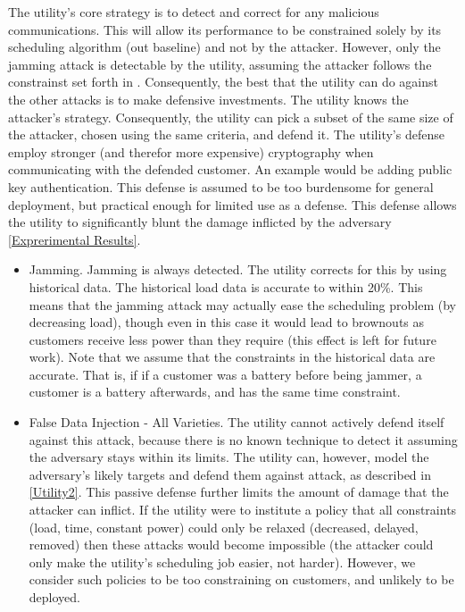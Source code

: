 \documentclass[conference]{IEEEtran}
\begin{document}
The utility's core strategy is to detect and correct for any malicious communications. This will allow its performance to be
constrained solely by its scheduling algorithm (out baseline) and not by the attacker. However, only the jamming attack is detectable by the utility, assuming the attacker follows the constrainst set forth in \cite{yuan2011modeling}. Consequently, the best that the utility can do against the other attacks is to make defensive investments. The utility knows the attacker's strategy.  Consequently, the utility can pick a subset of the same size of the attacker, chosen using the same criteria, and defend it. The utility's defense employ stronger (and therefor more expensive) cryptography when communicating with the defended customer.  An example would be adding public key authentication. This defense is assumed to be too burdensome for general deployment, but practical enough for limited use as a defense. This defense allows the utility to significantly blunt the damage inflicted by the adversary \ref{Exprerimental Results}.

\begin{itemize}
\item Jamming. Jamming is always detected. The utility corrects for this by using historical data. The historical load data is accurate to within 20\%.  This means that the jamming attack may actually ease the scheduling problem (by decreasing load), though even in this case it would lead to brownouts as customers receive less power than they require (this effect is left for future work).  Note that we assume that the constraints in the historical data are accurate. That is, if if a customer was a battery before being jammer, a customer is a battery afterwards, and has the same time constraint.

\item False Data Injection - All Varieties. The utility cannot actively defend itself against this attack, because there is no known technique to detect it assuming the adversary stays within its limits. The utility can, however, model the adversary's likely targets and defend them against attack, as described in \ref{Utility2}. This passive defense further limits the amount of damage that the attacker can inflict. If the utility were to institute a policy that all constraints (load, time, constant power) could only be relaxed (decreased, delayed, removed) then these attacks would become impossible (the attacker could only make the utility's scheduling job easier, not harder). However, we consider such policies to be too constraining on customers, and unlikely to be deployed.

\end{itemize}
\end{document}
